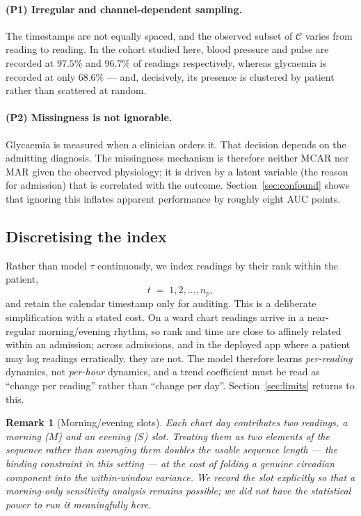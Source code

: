 \documentclass[11pt,a4paper]{article}
\newtheorem{remark}{Remark}
\begin{document}
\paragraph{(P1) Irregular and channel-dependent sampling.}
The timestamps are not equally spaced, and the observed subset of $\mathcal{C}$
varies from reading to reading. In the cohort studied here, blood pressure and
pulse are recorded at $97.5\%$ and $96.7\%$ of readings respectively, whereas
glycaemia is recorded at only $68.6\%$ --- and, decisively, its presence is
clustered by patient rather than scattered at random.

\paragraph{(P2) Missingness is not ignorable.}
Glycaemia is measured when a clinician orders it. That decision depends on the
admitting diagnosis. The missingness mechanism is therefore neither MCAR nor MAR
given the observed physiology; it is driven by a latent variable (the reason for
admission) that is correlated with the outcome. Section~\ref{sec:confound} shows
that ignoring this inflates apparent performance by roughly eight AUC points.

\subsection{Discretising the index}

Rather than model $\tau$ continuously, we index readings by their rank within the
patient,
\[
  t \;=\; 1,2,\dots,n_p,
\]
and retain the calendar timestamp only for auditing. This is a deliberate
simplification with a stated cost. On a ward chart readings arrive in a
near-regular morning/evening rhythm, so rank and time are close to affinely
related within an admission; across admissions, and in the deployed app where a
patient may log readings erratically, they are not. The model therefore learns
\emph{per-reading} dynamics, not \emph{per-hour} dynamics, and a trend coefficient
must be read as ``change per reading'' rather than ``change per day''.
Section~\ref{sec:limits} returns to this.

\begin{remark}[Morning/evening slots]
Each chart day contributes two readings, a morning ($M$) and an evening ($S$)
slot. Treating them as two elements of the sequence rather than averaging them
doubles the usable sequence length --- the binding constraint in this setting ---
at the cost of folding a genuine circadian component into the within-window
variance. We record the slot explicitly so that a morning-only sensitivity
analysis remains possible; we did not have the statistical power to run it
meaningfully here.
\end{remark}
\end{document}
